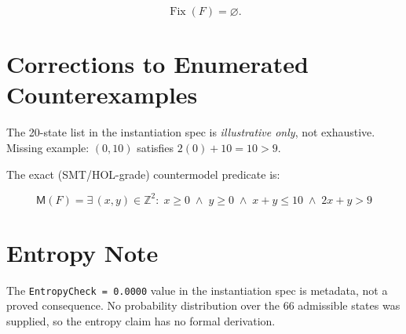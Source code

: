 \documentclass{article}
\begin{document}
\[
\boxed{\operatorname{Fix}(F) = \varnothing}.
\]

\section*{Corrections to Enumerated Counterexamples}

The 20-state list in the instantiation spec is \emph{illustrative only}, not exhaustive.
Missing example: $(0, 10)$ satisfies $2(0)+10 = 10 > 9$.

The exact (SMT/HOL-grade) countermodel predicate is:

\[
\boxed{
\mathsf{M}(F) =
\exists\,(x,y) \in \mathbb{Z}^2 :\;
x \ge 0 \;\land\; y \ge 0 \;\land\; x+y \le 10 \;\land\; 2x+y > 9
}
\]

\section*{Entropy Note}

The \texttt{EntropyCheck = 0.0000} value in the instantiation spec is metadata,
not a proved consequence. No probability distribution over the 66 admissible
states was supplied, so the entropy claim has no formal derivation.
\end{document}
